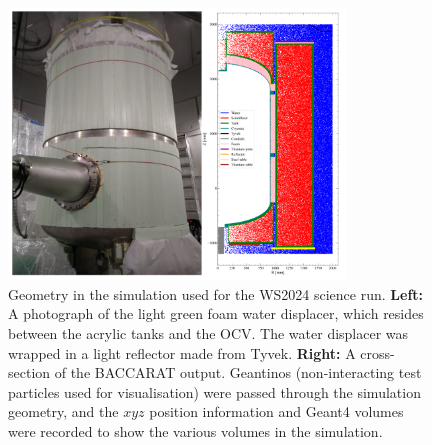 \begin{figure}[h!]
	\centering
	\includegraphics[width=0.8\textwidth]{figures/VetoEfficiency/FoamImgAndSimGeoTogether.png}
	\caption[An image of the foam displacer surrounding the OCS and final geometry in the simulation used for the WS2024 science run.]{Geometry in the simulation used for the WS2024 science run. \textbf{Left:} A photograph of the light green foam water displacer, which resides between the acrylic tanks and the OCV. The water displacer was wrapped in a light reflector made from Tyvek. \textbf{Right:} A cross-section of the BACCARAT output. Geantinos (non-interacting test particles used for visualisation) were passed through the simulation geometry, and the $xyz$ position information and Geant4 volumes were recorded to show the various volumes in the simulation.}
	\label{fig:VetoEff/od_geometry_for_sr3}
\end{figure}

